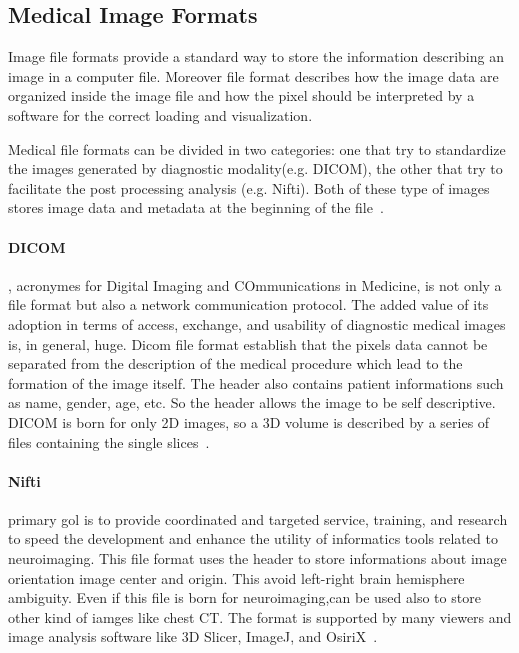 \documentclass{standalone}
\begin{document}
	\subsection{Medical Image Formats}
	
	Image file formats provide a standard way to store the information describing an image in a computer file. Moreover file format  describes how the image data are organized inside the image file and how the pixel should be interpreted by a software for the correct loading and visualization.
	
	Medical file formats can be divided in two categories: one that try to standardize the images generated by diagnostic modality(e.g. DICOM), the other that try to facilitate the post processing analysis (e.g. Nifti). Both of these type of images stores image data and metadata at the beginning of the file~\cite{ART:Larobina}. 
	
	\paragraph*{DICOM}, acronymes for Digital Imaging and COmmunications in Medicine, is not only a file format but also a network communication protocol. The added value of its adoption in terms of access, exchange, and usability of diagnostic medical images is, in general, huge.  Dicom file format establish that the pixels data cannot be separated from the description of the medical procedure which lead to the formation of the image itself. The header also contains patient informations such as name, gender, age, etc. So the header allows the image to be self descriptive. 
	DICOM is born for only 2D images, so a 3D volume is described by a series of files containing the single slices~\cite{ART:Larobina}. 
	
	\paragraph*{Nifti} primary gol is to provide coordinated and targeted service, training, and research to speed the development and enhance the utility of informatics tools related to neuroimaging. This file format uses the header to store informations about image orientation image center and origin. This avoid left-right brain hemisphere ambiguity.  Even if this file is born for neuroimaging,can be used also to store other kind of iamges like chest CT. The format is supported by many viewers and image analysis software like 3D Slicer, ImageJ, and OsiriX~\cite{ART:Larobina}. 
	
	
\end{document}
